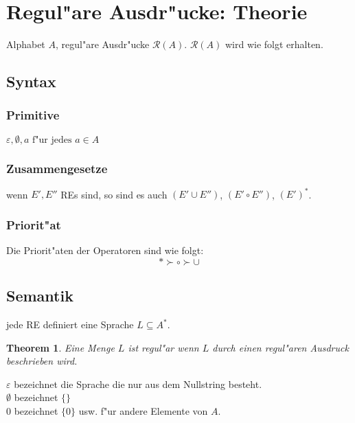 \documentclass[german, 10pt, a4paper, twocolumn]{scrartcl}
\newtheorem{theorem}{Theorem}[section]
\theoremstyle{definition}
\theoremstyle{example}
\begin{document}
\section{Regul"are Ausdr"ucke: Theorie}

Alphabet $A$, regul"are Ausdr"ucke $\mathcal{R}(A)$. $\mathcal{R}(A)$ wird wie folgt erhalten.

\subsection{Syntax}

\subsubsection{Primitive}

$\varepsilon,\emptyset, a \mbox{ f"ur jedes } a \in A$

\subsubsection{Zusammengesetze}

wenn $E',E''$ REs sind, so sind es auch $( E' \cup E'' )$, $( E' \circ E'' )$, $( E' )^*$.\\

\subsubsection{Priorit"at}

Die Priorit"aten der Operatoren sind wie folgt:
\begin{displaymath}
	* \succ \circ \succ \cup
\end{displaymath}


\subsection{Semantik}

jede RE definiert eine Sprache $L \subseteq A^*$.

\begin{theorem}
	Eine Menge $L$ ist regul"ar wenn $L$ durch einen regul"aren Ausdruck beschrieben wird.
\end{theorem}

$\varepsilon$ bezeichnet die Sprache die nur aus dem Nullstring besteht.\\
$\emptyset$ bezeichnet $\{\}$\\
$0$ bezeichnet $\{0\}$ usw. f"ur andere Elemente von $A$.\\
\end{document}

